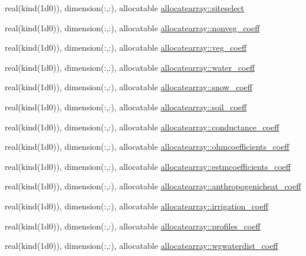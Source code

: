 \begin{DoxyCompactItemize}
\item 
real(kind(1d0)), dimension(\+:,\+:), allocatable \hyperlink{namespaceallocatearray_a08dfc69cdb208d383ab68d12d7424eb9}{allocatearray\+::siteselect}
\item 
real(kind(1d0)), dimension(\+:,\+:), allocatable \hyperlink{namespaceallocatearray_a3bc78607c50c9b5b7ce41298703bb51a}{allocatearray\+::nonveg\+\_\+coeff}
\item 
real(kind(1d0)), dimension(\+:,\+:), allocatable \hyperlink{namespaceallocatearray_ae6d924183e0a7e4015250d825d997423}{allocatearray\+::veg\+\_\+coeff}
\item 
real(kind(1d0)), dimension(\+:,\+:), allocatable \hyperlink{namespaceallocatearray_ad52819ac6636f70c1067c6d2e645e542}{allocatearray\+::water\+\_\+coeff}
\item 
real(kind(1d0)), dimension(\+:,\+:), allocatable \hyperlink{namespaceallocatearray_aacffb567ae9e14682180226d82bc8c62}{allocatearray\+::snow\+\_\+coeff}
\item 
real(kind(1d0)), dimension(\+:,\+:), allocatable \hyperlink{namespaceallocatearray_a61ef42dc2ae8e0b11fe76576d463f176}{allocatearray\+::soil\+\_\+coeff}
\item 
real(kind(1d0)), dimension(\+:,\+:), allocatable \hyperlink{namespaceallocatearray_a71b336f3aa2b306302e6bde6181deffc}{allocatearray\+::conductance\+\_\+coeff}
\item 
real(kind(1d0)), dimension(\+:,\+:), allocatable \hyperlink{namespaceallocatearray_ac7142ba3662e197598dceb16e1cc01be}{allocatearray\+::ohmcoefficients\+\_\+coeff}
\item 
real(kind(1d0)), dimension(\+:,\+:), allocatable \hyperlink{namespaceallocatearray_a7d74d9d08873f1a7215ac88608434548}{allocatearray\+::estmcoefficients\+\_\+coeff}
\item 
real(kind(1d0)), dimension(\+:,\+:), allocatable \hyperlink{namespaceallocatearray_a5288a5b9849ea3c057ec815db0858a9e}{allocatearray\+::anthropogenicheat\+\_\+coeff}
\item 
real(kind(1d0)), dimension(\+:,\+:), allocatable \hyperlink{namespaceallocatearray_ad5f029a4d718b470c2e33f000bde77f5}{allocatearray\+::irrigation\+\_\+coeff}
\item 
real(kind(1d0)), dimension(\+:,\+:), allocatable \hyperlink{namespaceallocatearray_afdc7bc9e6e97bc7071ef1fc93ea78856}{allocatearray\+::profiles\+\_\+coeff}
\item 
real(kind(1d0)), dimension(\+:,\+:), allocatable \hyperlink{namespaceallocatearray_a87e57bcd0e82e8977342bdfd009ffd37}{allocatearray\+::wgwaterdist\+\_\+coeff}

\end{DoxyCompactItemize}
